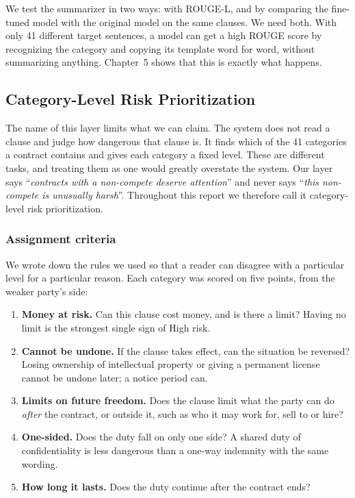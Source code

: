 We test the summarizer in two ways: with ROUGE-L, and by comparing the fine-tuned model with the original model on the same clauses. We need both. With only 41 different target sentences, a model can get a high ROUGE score by recognizing the category and copying its template word for word, without summarizing anything. Chapter~5 shows that this is exactly what happens.
\subsection{Category-Level Risk Prioritization}
\label{sec:risk}
The name of this layer limits what we can claim. The system does not read a clause and judge how dangerous that clause is. It finds which of the 41 categories a contract contains and gives each category a fixed level. These are different tasks, and treating them as one would greatly overstate the system. Our layer says ``\emph{contracts with a non-compete deserve attention}'' and never says ``\emph{this non-compete is unusually harsh}''. Throughout this report we therefore call it category-level risk prioritization.

\subsubsection{Assignment criteria}
\label{sec:riskcriteria}
We wrote down the rules we used so that a reader can disagree with a particular level for a particular reason. Each category was scored on five points, from the weaker party's side:

\begin{enumerate}[itemsep=3pt]
  \item \textbf{Money at risk.} Can this clause cost money, and is there a limit? Having no limit is the strongest single sign of High risk.
  \item \textbf{Cannot be undone.} If the clause takes effect, can the situation be reversed? Losing ownership of intellectual property or giving a permanent license cannot be undone later; a notice period can.
  \item \textbf{Limits on future freedom.} Does the clause limit what the party can do \emph{after} the contract, or outside it, such as who it may work for, sell to or hire?
  \item \textbf{One-sided.} Does the duty fall on only one side? A shared duty of confidentiality is less dangerous than a one-way indemnity with the same wording.
  \item \textbf{How long it lasts.} Does the duty continue after the contract ends?
\end{enumerate}

